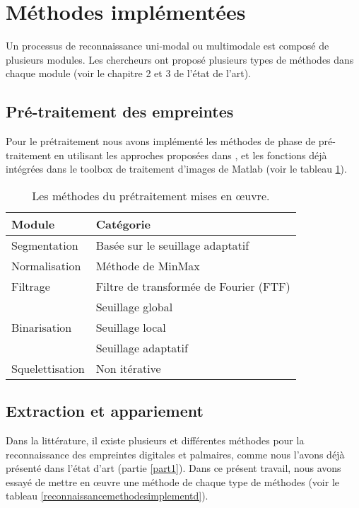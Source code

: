 \section{Méthodes implémentées}
Un processus de reconnaissance uni-modal ou multimodale est composé de plusieurs modules. Les chercheurs ont proposé plusieurs types de méthodes dans chaque module (voir le chapitre 2 et 3 de l’état de l’art).

\subsection{Pré-traitement des empreintes}
Pour le prétraitement nous avons implémenté les méthodes de phase de pré-traitement en utilisant les approches proposées dans \citep{khan2011fingerprint}, \citep{hong1998fingerprint} et les fonctions déjà intégrées dans le toolbox de traitement d’images de Matlab (voir le tableau \ref{pretraimethodes}).
\begin{table}[H]
	\centering
	
	\begin{tabular}{|l|l|}
		\hline
		\textbf{Module} & \textbf{Catégorie} \\ \hline
		Segmentation & Basée sur le seuillage adaptatif \\ \hline
		Normalisation & Méthode de MinMax \\ \hline
		Filtrage & Filtre de transformée de Fourier (FTF) \\ \hline
		\multirow{3}{*}{Binarisation} & Seuillage global \\ \cline{2-2} 
		& Seuillage local \\ \cline{2-2} 
		& Seuillage adaptatif \\ \hline
		Squelettisation & Non itérative \\ \hline
	\end{tabular}
	
	\caption{Les méthodes du prétraitement mises en œuvre.\label{pretraimethodes}}
\end{table}
\subsection{Extraction et appariement}
Dans la littérature, il existe plusieurs et différentes méthodes pour la reconnaissance des empreintes digitales et palmaires, comme nous l'avons déjà présenté dans l'état d'art (partie \ref{part1}). Dans ce présent travail, nous avons essayé de mettre en œuvre une méthode de chaque type de méthodes (voir le tableau \ref{reconnaissancemethodesimplementd}).

